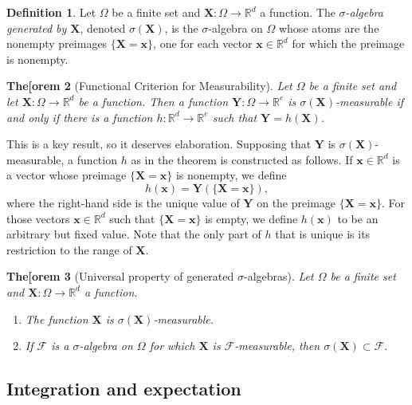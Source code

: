 \documentclass[11pt]{book}
\newtheorem{thm}{The[orem}[section]
\theoremstyle{definition}
\newtheorem{defn}[thm]{Definition}
\numberwithin{equation}{section}
\begin{document}
\begin{defn}
	Let $\Omega$ be a finite set and $\mathbf{X}: \Omega \to \mathbb{R}^d$ a function. The \textit{$\sigma$-algebra generated by $\mathbf{X}$}, denoted $\sigma(\mathbf{X})$, is the $\sigma$-algebra on $\Omega$ whose atoms are the nonempty preimages $\{\mathbf{X} = \mathbf{x}\}$, one for each vector $\mathbf{x}\in \mathbb{R}^d$ for which the preimage is nonempty.
\end{defn}

\begin{thm}[Functional Criterion for Measurability]\label{thm:functional-criterion-measurable}
	Let $\Omega$ be a finite set and let $\mathbf{X}: \Omega \to \mathbb{R}^d$ be a function. Then a function $\mathbf{Y}: \Omega \to \mathbb{R}^e$ is $\sigma(\mathbf{X})$-measurable if and only if there is a function $h: \mathbb{R}^d \to \mathbb{R}^e$ such that $\mathbf{Y} = h(\mathbf{X})$.
\end{thm}

This is a key result, so it deserves elaboration. Supposing that $\mathbf{Y}$ is $\sigma(\mathbf{X})$-measurable, a function $h$ as in the theorem is constructed as follows. If $\mathbf{x}\in \mathbb{R}^d$ is a vector whose preimage $\{\mathbf{X} = \mathbf{x}\}$ is nonempty, we define
\[
	h(\mathbf{x}) = \mathbf{Y}(\{\mathbf{X} = \mathbf{x}\}),
\]
where the right-hand side is the unique value of $\mathbf{Y}$ on the preimage $\{\mathbf{X} = \mathbf{x}\}$. For those vectors $\mathbf{x}\in \mathbb{R}^d$ such that $\{\mathbf{X} = \mathbf{x}\}$ is empty, we define $h(\mathbf{x})$ to be an arbitrary but fixed value. Note that the only part of $h$ that is unique is its restriction to the range of $\mathbf{X}$.

\begin{thm}[Universal property of generated $\sigma$-algebras]
	Let $\Omega$ be a finite set and $\mathbf{X}: \Omega \to \mathbb{R}^d$ a function.
	\begin{enumerate}
		\item The function $\mathbf{X}$ is $\sigma(\mathbf{X})$-measurable.
		\item If $\mathcal{F}$ is a $\sigma$-algebra on $\Omega$ for which $\mathbf{X}$ is $\mathcal{F}$-measurable, then $\sigma(\mathbf{X}) \subset \mathcal{F}$.
	\end{enumerate}
\end{thm}

\subsection{Integration and expectation}
\end{document}
